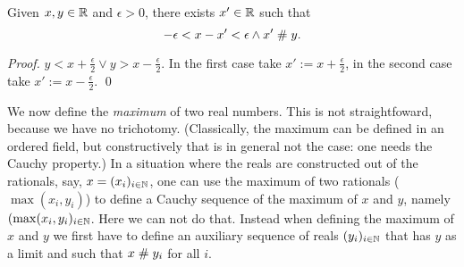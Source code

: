 
\begin{lemma}\label{lemapy}
Given $x,y\in\mathbb{R}$ and $\epsilon>0$, there exists $x'\in\mathbb{R}$ such that
$$-\epsilon < x-x'< \epsilon \wedge x'\mathrel{\#} y.$$ 
\end{lemma}

\begin{proof}
$y< x+\frac{\epsilon}{2} \vee y> x-\frac{\epsilon}{2}$. In the first
case take $x' := x+\frac{\epsilon}{2}$, in the second case take $x' :=
x-\frac{\epsilon}{2}$.
\qed
\end{proof}

We now define the {\em maximum\/} of two real numbers. This is not
straightfoward, because we have no trichotomy. (Classically, the
maximum can be defined in an ordered field, but constructively that is
in general not the case: one needs the Cauchy property.) In a
situation where the reals are constructed out of the rationals, say,
$x = (x_i)_{i\in \mathbb{N}}$, one can use the maximum of two rationals
($\max(x_i,y_i)$) to define a Cauchy sequence of
the maximum of $x$ and $y$, namely $(\max(x_i,y_i)_{i\in \mathbb{N}}$.
Here we can not do that. Instead when defining the maximum of $x$ and
$y$ we first have to define an auxiliary sequence of reals
$(y_i)_{i\in\mathbb{N}}$ that has $y$ as a limit and such that $x\mathrel{\#} y_i$
for all $i$.

